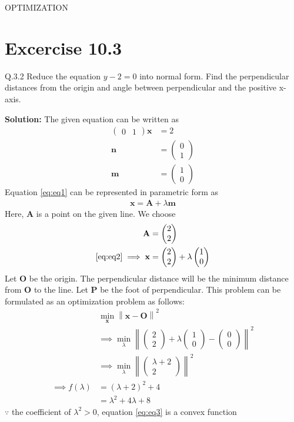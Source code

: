 \documentclass[12pt]{article}
\providecommand{\brak}[1]{\ensuremath{\left(#1\right)}}
\providecommand{\norm}[1]{\left\lVert#1\right\rVert}
\newcommand{\solution}{\noindent \textbf{Solution: }}
\newcommand{\myvec}[1]{\ensuremath{\begin{pmatrix}#1\end{pmatrix}}}
\let\vec\mathbf
\begin{document}
\begin{center}
\textbf\large{OPTIMIZATION}

\end{center}
\section*{Excercise 10.3}

Q.3.2 Reduce the equation $y-2=0$ into normal form. Find the perpendicular distances from the origin and angle between perpendicular and the positive x-axis.

\solution
The given equation can be written as
\begin{align}
	\label{eq:eq1}
	\myvec{0&1}\vec{x} &= 2\\
	\vec{n} &= \myvec{0\\1}\\
	\vec{m} &= \myvec{1\\0}
\end{align}
Equation \eqref{eq:eq1} can be represented in parametric form as
\begin{align}
	\label{eq:eq2}
	\vec{x} = \vec{A}+\lambda\vec{m}
\end{align}
Here, $\vec{A}$ is a point on the given line. We choose
\begin{align}
	\vec{A} &= \myvec{2\\2}\\
	\label{eq:line}
	\eqref{eq:eq2} \implies \vec{x} &= \myvec{2\\2}+\lambda\myvec{1\\0}
\end{align}
Let $\vec{O}$ be the origin. The perpendicular distance will be the minimum distance from $\vec{O}$ to the line. Let $\vec{P}$ be the foot of perpendicular. This problem can be formulated as an optimization problem as follows:
\begin{align}
	& \min_{\vec{x}}\norm{\vec{x}-\vec{O}}^2\\
	& \implies \min_{\lambda}\norm{\myvec{2\\2}+\lambda\myvec{1\\0}-\myvec{0\\0}}^2\\
	& \implies \min_{\lambda}\norm{\myvec{\lambda+2\\2}}^2\\
	\implies f\brak{\lambda} &= \brak{\lambda+2}^2+4\\
	\label{eq:eq3}
	&= \lambda^2+4\lambda+8
\end{align}
$\because$ the coefficient of $\lambda^2>0$, equation \eqref{eq:eq3} is a convex function
\end{document}
